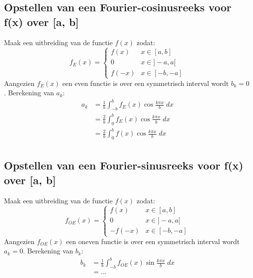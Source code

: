 	\subsection{Opstellen van een Fourier-cosinusreeks voor f(x) over [a, b]}
	Maak een uitbreiding van de functie $f(x)$ zodat:
	$$f_E(x) = \begin{cases}
			f(x)  & x \in [a, b]   \\
			0     & x \in ]-a, a[  \\
			f(-x) & x \in [-b, -a]
		\end{cases}$$
	Aangezien $f_E(x)$ een even functie is over een symmetrisch interval wordt $b_k = 0$. Berekening van $a_k$:
	\begin{equation*}
		\begin{split}
			a_k & = \frac{1}{b} \int_{-b}^b f_E(x) \cos \frac{k\pi x}{b} \; dx \\
			& = \frac{2}{b} \int_0^b f_E(x)\cos \frac{k\pi x}{b} \; dx \\
			& = \frac{2}{b} \int_0^b f(x)\cos \frac{k\pi x}{b} \; dx \\
		\end{split}
	\end{equation*}

	\subsection{Opstellen van een Fourier-sinusreeks voor f(x) over [a, b]}
	Maak een uitbreiding van de functie $f(x)$ zodat:
	$$f_{OE}(x) = \begin{cases}
			f(x)   & x \in [a, b]   \\
			0      & x \in ]-a, a[  \\
			-f(-x) & x \in [-b, -a]
		\end{cases}$$
	Aangezien $f_{OE}(x)$ een oneven functie is over een symmetrisch interval wordt $a_k = 0$. Berekening van $b_k$: 
\begin{equation*}
	\begin{split}
		b_k & = \frac{1}{b} \int_{-b}^b f_{OE}(x) \sin \frac{k\pi x}{b} \; dx \\
		& = ...
	\end{split}
\end{equation*}

